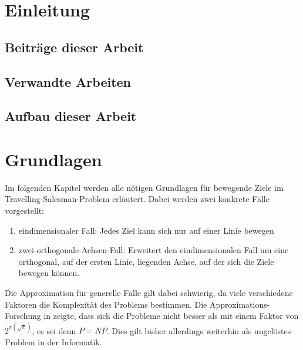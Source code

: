 \documentclass[german,version-2019-11]{uzl-thesis}
\begin{document}
\chapter{Einleitung}


\section{Beiträge dieser Arbeit}



\section{Verwandte Arbeiten}



\section{Aufbau dieser Arbeit}


\chapter{Grundlagen}
\label{chapter-use}
Im folgenden Kapitel werden alle nötigen Grundlagen für bewegende Ziele im Travelling-Salesman-Problem erläutert. Dabei werden zwei konkrete Fälle vorgestellt:
\begin{enumerate}
\item eindimensionaler Fall: Jedes Ziel kann sich nur auf einer Linie bewegen
\item zwei-orthogonale-Achsen-Fall: Erweitert den eindimensionalen Fall um eine orthogonal, auf der ersten Linie, liegenden Achse, auf der sich die Ziele bewegen können.
\end{enumerate}
Die Approximation für generelle Fälle gilt dabei schwierig, da viele verschiedene Faktoren die Komplexität des Problems bestimmen. Die Approximations-Forschung in \cite{hammar} zeigte, dass sich die Probleme nicht besser als mit einem Faktor von $2^{\pi(\sqrt{\pi})}$, es sei denn $P=NP$. Dies gilt bisher allerdings weiterhin als ungelöstes Problem in der Informatik.
\end{document}
